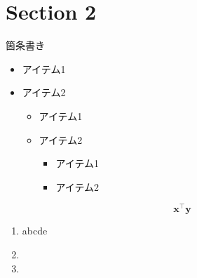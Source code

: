 \documentclass[aspectratio=169, dvipdfmx, 11pt]{beamer} %
\begin{document}
\section{Section 2}
\begin{frame}{箇条書き}
    \begin{itemize}
    \item アイテム1
    \item \alert{アイテム2}
        \begin{itemize}
        \item アイテム1
        \item \alert{アイテム2}
            \begin{itemize}
            \item アイテム1
            \item \alert{アイテム2}
            \end{itemize}
        \end{itemize}
    \end{itemize}
    \[
    \bm{x}^\top\bm{y}
    \]
    \begin{enumerate}
    \item abcde
    \item {}
    \item 
    \end{enumerate}
\end{frame}
\end{document}

